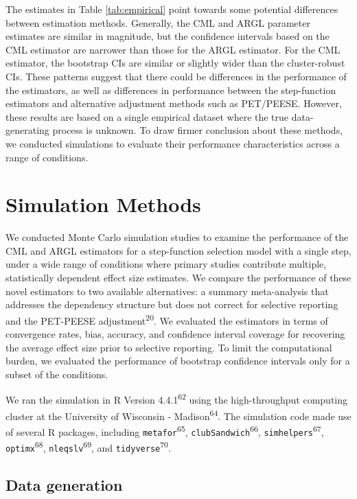 \documentclass[
  man, donotrepeattitle,floatsintext]{apa7}
\begin{document}
The estimates in Table \ref{tab:empirical} point towards some potential differences between estimation methods.
Generally, the CML and ARGL parameter estimates are similar in magnitude, but the confidence intervals based on the CML estimator are narrower than those for the ARGL estimator.
For the CML estimator, the bootstrap CIs are similar or slightly wider than the cluster-robust CIs.
These patterns suggest that there could be differences in the performance of the estimators, as well as differences in performance between the step-function estimators and alternative adjustment methods such as PET/PEESE.
However, these results are based on a single empirical dataset where the true data-generating process is unknown.
To draw firmer conclusion about these methods, we conducted simulations to evaluate their performance characteristics across a range of conditions.

\section{Simulation Methods}\label{simulation-methods}

We conducted Monte Carlo simulation studies to examine the performance
of the CML and ARGL estimators for a step-function selection model with a single step, under a wide range of conditions where primary studies contribute multiple, statistically dependent effect size estimates.
We compare the performance of these novel estimators to two available alternatives: a summary meta-analysis that addresses the dependency structure but does not correct for selective reporting and the PET-PEESE adjustment\textsuperscript{20}.
We evaluated the estimators in terms of convergence rates, bias, accuracy, and confidence interval coverage for recovering the average effect size prior to selective reporting.
To limit the computational burden, we evaluated the performance of bootstrap confidence intervals only for a subset of the conditions.

We ran the simulation in R Version 4.4.1\textsuperscript{62} using the high-throughput computing cluster at the University of Wisconsin - Madison\textsuperscript{64}.
The simulation code made use of several R packages, including \texttt{metafor}\textsuperscript{65}, \texttt{clubSandwich}\textsuperscript{66}, \texttt{simhelpers}\textsuperscript{67}, \texttt{optimx}\textsuperscript{68}, \texttt{nleqslv}\textsuperscript{69}, and \texttt{tidyverse}\textsuperscript{70}.

\subsection{Data generation}\label{data-generation}
\end{document}
